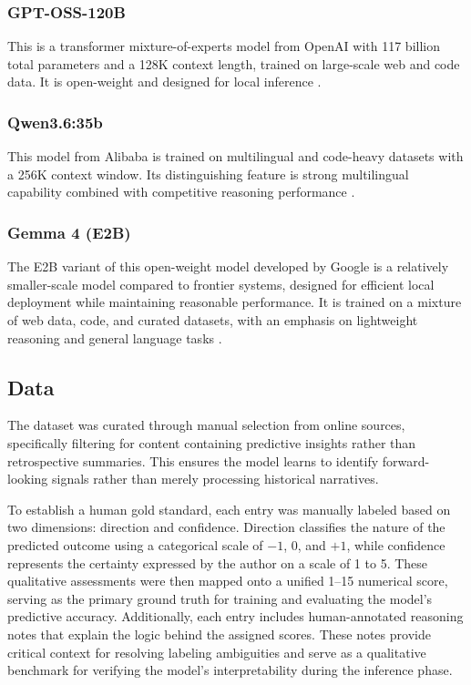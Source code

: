 \documentclass[sigconf,screen]{acmart}
\begin{document}
\subsubsection{GPT-OSS-120B}
This is a transformer mixture-of-experts model from OpenAI with 117 billion
total parameters and a 128K context length, trained on large-scale web and
code data. It is open-weight and designed for local inference
\cite{openai2025gptossmodelcard}.

\subsubsection{Qwen3.6:35b}
This model from Alibaba is trained on multilingual and code-heavy datasets with
a 256K context window. Its distinguishing feature is strong multilingual
capability combined with competitive reasoning performance
\cite{ollama2026qwen36}.

\subsubsection{Gemma 4 (E2B)}
The E2B variant of this open-weight model developed by Google is a relatively
smaller-scale model compared to frontier systems, designed for efficient local
deployment while maintaining reasonable performance. It is trained on a
mixture of web data, code, and curated datasets, with an emphasis on
lightweight reasoning and general language tasks \cite{google2026gemma4e2b}.

\subsection{Data}
The dataset was curated through manual selection from online sources,
specifically filtering for content containing predictive insights rather than
retrospective summaries. This ensures the model learns to identify
forward-looking signals rather than merely processing historical narratives.

To establish a human gold standard, each entry was manually labeled based on
two dimensions: direction and confidence. Direction classifies the nature of
the predicted outcome using a categorical scale of $-1$, $0$, and $+1$, while
confidence represents the certainty expressed by the author on a scale of 1
to 5. These qualitative assessments were then mapped onto a unified 1--15
numerical score, serving as the primary ground truth for training and
evaluating the model's predictive accuracy. Additionally, each entry includes
human-annotated reasoning notes that explain the logic behind the assigned
scores. These notes provide critical context for resolving labeling
ambiguities and serve as a qualitative benchmark for verifying the model's
interpretability during the inference phase.
\end{document}
